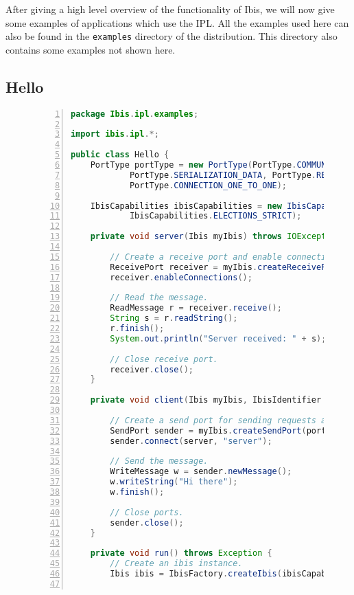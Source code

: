 After giving a high level overview of the functionality of Ibis, we will
now give some examples of applications which use the IPL. All the
examples used here can also be found in the \texttt{examples} directory
of the distribution. This directory also contains some examples not
shown here.

\subsection{Hello}
\begin{figure}[p]
\begin{lstlisting}[language=Java,numbers=left, numbersep=3pt]
package Ibis.ipl.examples;

import ibis.ipl.*;

public class Hello {
    PortType portType = new PortType(PortType.COMMUNICATION_RELIABLE,
            PortType.SERIALIZATION_DATA, PortType.RECEIVE_EXPLICIT,
            PortType.CONNECTION_ONE_TO_ONE);

    IbisCapabilities ibisCapabilities = new IbisCapabilities(
            IbisCapabilities.ELECTIONS_STRICT);

    private void server(Ibis myIbis) throws IOException {

        // Create a receive port and enable connections.
        ReceivePort receiver = myIbis.createReceivePort(portType, "server");
        receiver.enableConnections();

        // Read the message.
        ReadMessage r = receiver.receive();
        String s = r.readString();
        r.finish();
        System.out.println("Server received: " + s);

        // Close receive port.
        receiver.close();
    }

    private void client(Ibis myIbis, IbisIdentifier server) throws IOException {

        // Create a send port for sending requests and connect.
        SendPort sender = myIbis.createSendPort(portType);
        sender.connect(server, "server");

        // Send the message.
        WriteMessage w = sender.newMessage();
        w.writeString("Hi there");
        w.finish();

        // Close ports.
        sender.close();
    }

    private void run() throws Exception {
        // Create an ibis instance.
        Ibis ibis = IbisFactory.createIbis(ibisCapabilities, null, portType);


\end{lstlisting}
\end{figure}

